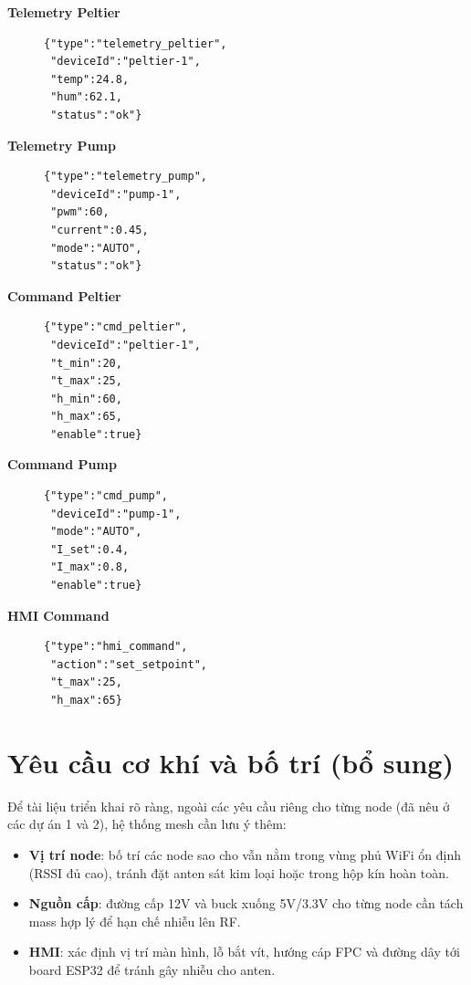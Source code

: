 \documentclass[12pt,a4paper]{report}
\begin{document}
\begin{description}
  \item[\textbf{Telemetry Peltier}]
  \begin{verbatim}
{"type":"telemetry_peltier",
 "deviceId":"peltier-1",
 "temp":24.8,
 "hum":62.1,
 "status":"ok"}
  \end{verbatim}

  \item[\textbf{Telemetry Pump}]
  \begin{verbatim}
{"type":"telemetry_pump",
 "deviceId":"pump-1",
 "pwm":60,
 "current":0.45,
 "mode":"AUTO",
 "status":"ok"}
  \end{verbatim}

  \item[\textbf{Command Peltier}]
  \begin{verbatim}
{"type":"cmd_peltier",
 "deviceId":"peltier-1",
 "t_min":20,
 "t_max":25,
 "h_min":60,
 "h_max":65,
 "enable":true}
  \end{verbatim}

  \item[\textbf{Command Pump}]
  \begin{verbatim}
{"type":"cmd_pump",
 "deviceId":"pump-1",
 "mode":"AUTO",
 "I_set":0.4,
 "I_max":0.8,
 "enable":true}
  \end{verbatim}

  \item[\textbf{HMI Command}]
  \begin{verbatim}
{"type":"hmi_command",
 "action":"set_setpoint",
 "t_max":25,
 "h_max":65}
  \end{verbatim}
\end{description}

\section{Yêu cầu cơ khí và bố trí (bổ sung)}
Để tài liệu triển khai rõ ràng, ngoài các yêu cầu riêng cho từng node (đã nêu ở các dự án 1 và 2), hệ thống mesh cần lưu ý thêm:
\begin{itemize}
  \item \textbf{Vị trí node}: bố trí các node sao cho vẫn nằm trong vùng phủ WiFi ổn định (RSSI đủ cao), tránh đặt anten sát kim loại hoặc trong hộp kín hoàn toàn.
  \item \textbf{Nguồn cấp}: đường cấp 12V và buck xuống 5V/3.3V cho từng node cần tách mass hợp lý để hạn chế nhiễu lên RF.
  \item \textbf{HMI}: xác định vị trí màn hình, lỗ bắt vít, hướng cáp FPC và đường dây tới board ESP32 để tránh gây nhiễu cho anten.
\end{itemize}
\end{document}

